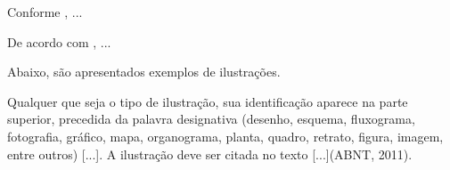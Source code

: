 \documentclass[
  oneside, %
  english,
  brazil
]{abntbibufjf}
\begin{document}
Conforme \citep{Bauman99}, ...

De acordo com \citet*{disp2019}, ...



Abaixo, são apresentados exemplos de ilustrações.

Qualquer que seja o tipo de ilustração, sua identificação aparece na parte superior, precedida da palavra designativa (desenho, esquema, fluxograma, fotografia, gráfico, mapa, organograma, planta, quadro, retrato, figura, imagem, entre outros) [...].
A ilustração deve ser citada no texto [...](ABNT, 2011).










\end{document}

